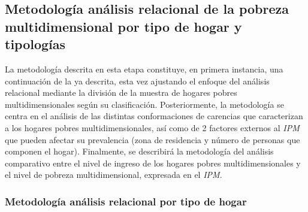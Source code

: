 \documentclass[12pt,letterpaper,spanish]{article}
\begin{document}
\subsection{Metodología análisis relacional de la pobreza multidimensional por tipo de hogar y tipologías}

La metodología descrita en esta etapa constituye, en primera instancia, una continuación de la ya descrita, esta vez ajustando el enfoque del análisis relacional mediante la división de la muestra de hogares pobres multidimensionales según su clasificación. Posteriormente, la metodología se centra en el análisis de las distintas conformaciones de carencias que caracterizan a los hogares pobres multidimensionales, así como de 2 factores externos al \textit{IPM} que pueden afectar su prevalencia (zona de residencia y número de personas que componen el hogar). Finalmente, se describirá la metodología del análisis comparativo entre el nivel de ingreso de los hogares pobres multidimensionales  y el nivel de pobreza multidimensional, expresada en el \textit{IPM}. 



\subsubsection{Metodología análisis relacional por tipo de hogar}
    
\end{document}
